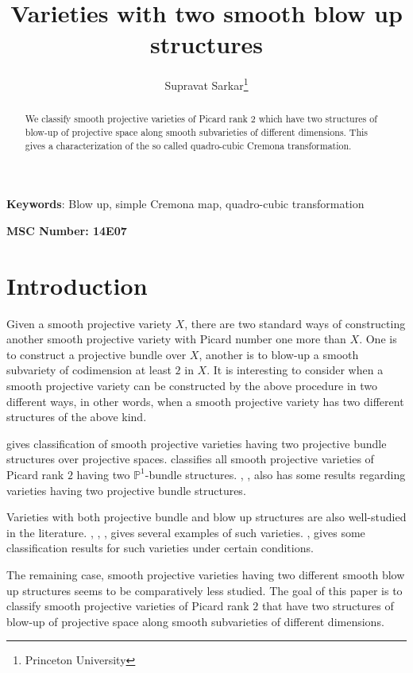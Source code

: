 \documentclass{article}
\title{Varieties with two smooth blow up structures}
\date{}
\author{Supravat Sarkar\footnote{Princeton University}}
\begin{document}
\maketitle
\begin{abstract}
 We classify smooth projective varieties of Picard rank $2$ which have two structures of blow-up of projective space along smooth subvarieties of different dimensions. This gives a characterization of the so called quadro-cubic Cremona transformation.
\end{abstract}
\begin{center}
\textbf{Keywords}: Blow up, simple Cremona map, quadro-cubic transformation
\end{center}
\begin{center}
\textbf{MSC Number: 14E07} 
\end{center}
\section{Introduction}
 Given a smooth projective variety $X$, there are two standard ways of constructing another smooth projective variety with Picard number one more than $X$. One is to construct a projective bundle over $X$, another is to blow-up a smooth subvariety of codimension at least $2$ in $X$. It is interesting to consider when a smooth projective variety can be constructed by the above procedure in two different ways, in other words, when a smooth projective variety has two different structures of the above kind.
 
 \cite{sato1985varieties} gives classification of smooth projective varieties having two projective bundle structures over projective spaces. \cite{kanemitsu2019extremal} classifies all smooth projective varieties of Picard rank $2$ having two $\mathbb{P}^1$-bundle structures. \cite{bansal2023isomorphism}, \cite{occhetta2022manifolds}, \cite{occhetta2002euler} also has some results regarding varieties having two projective bundle structures.

 Varieties with both projective bundle and blow up structures are also well-studied in the literature. \cite{vats2024correspondence}, \cite{ray2020examples}, \cite{galkin2022projective}, \cite{bansal2024extremal} gives several examples of such varieties. \cite{li2021projective}, \cite{li2024projective} gives some classification results for such varieties under certain conditions.

 The remaining case, smooth projective varieties having two different smooth blow up structures seems to be comparatively less studied. The goal of this paper is to classify smooth projective varieties of Picard rank $2$ that have two structures of blow-up of projective space along smooth subvarieties of different dimensions.
\end{document}
